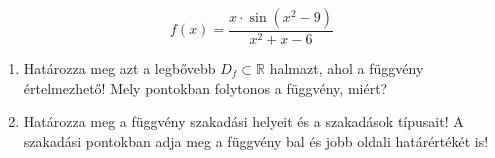 \documentclass[11pt]{scrartcl}
\begin{document}
\[
	f(x) = \frac{x \cdot \sin(x^2 - 9)}{x^2 + x - 6}
\]
\begin{enumerate}
	\item Határozza meg azt a legbővebb $D_f \subset \mathbb{R}$ halmazt, ahol a
	      függvény értelmezhető! Mely pontokban folytonos a függvény, miért?

	\item Határozza meg a függvény szakadási helyeit és a szakadások típusait!
	      A szakadási pontokban adja meg a függvény bal és jobb oldali
	      határértékét is!
\end{enumerate}
\end{document}
